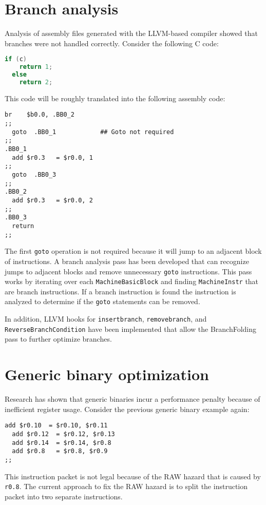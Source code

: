 \section{Branch analysis}
Analysis of assembly files generated with the LLVM-based compiler showed that branches were not handled correctly. Consider the following C code:

\begin{lstlisting}[language=c]
  if (c)
    return 1;
  else
    return 2;
\end{lstlisting}
\newpage
This code will be roughly translated into the following assembly code:


\begin{lstlisting}[language=rvex]
  br    $b0.0, .BB0_2
;;
  goto  .BB0_1            ## Goto not required
;;
.BB0_1
  add $r0.3   = $r0.0, 1
;;
  goto  .BB0_3
;;
.BB0_2
  add $r0.3   = $r0.0, 2
;;
.BB0_3
  return
;;
\end{lstlisting}

The first \texttt{goto} operation is not required because it will jump to an adjacent block of instructions. A branch analysis pass has been developed that can recognize jumps to adjacent blocks and remove unnecessary \texttt{goto} instructions. This pass works by iterating over each \texttt{MachineBasicBlock} and finding \texttt{MachineInstr} that are branch instructions. If a branch instruction is found the instruction is analyzed to determine if the \texttt{goto} statements can be removed. 

In addition, LLVM hooks for \texttt{insertbranch}, \texttt{removebranch}, and \texttt{ ReverseBranchCondition} have been implemented that allow the BranchFolding pass to further optimize branches.


\section{Generic binary optimization}
Research \cite{Anthony-Brandon:2013jk} has shown  that generic binaries incur a performance penalty because of inefficient register usage. Consider the previous generic binary example again:

\begin{lstlisting}[language=rvex]
  add $r0.10  = $r0.10, $r0.11
  add $r0.12  = $r0.12, $r0.13
  add $r0.14  = $r0.14, $r0.8
  add $r0.8   = $r0.8, $r0.9
;; 
\end{lstlisting}

This instruction packet is not legal because of the RAW hazard that is caused by \texttt{r0.8}. The current approach to fix the RAW hazard is to split the instruction packet into two separate instructions. 

